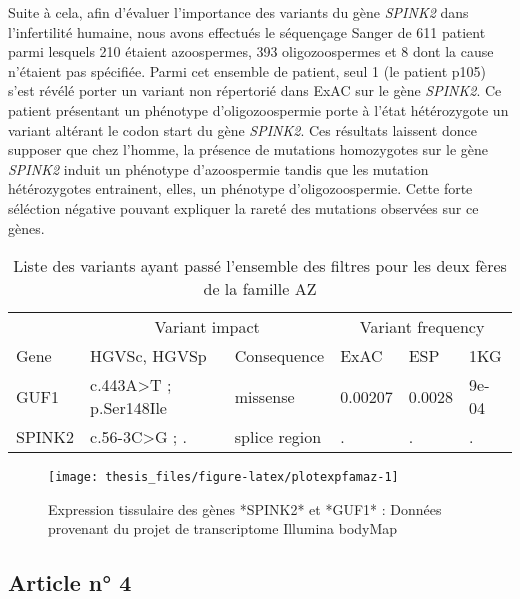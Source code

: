 \documentclass[12pt,twoside]{reedthesis}
\theoremstyle{definition}
\theoremstyle{definition}
\theoremstyle{remark}
\begin{document}
  Suite à cela, afin d'évaluer l'importance des variants du gène
  \emph{SPINK2} dans l'infertilité humaine, nous avons effectués le
  séquençage Sanger de 611 patient parmi lesquels 210 étaient azoospermes,
  393 oligozoospermes et 8 dont la cause n'étaient pas spécifiée. Parmi
  cet ensemble de patient, seul 1 (le patient p105) s'est révélé porter un
  variant non répertorié dans ExAC sur le gène \emph{SPINK2}. Ce patient
  présentant un phénotype d'oligozoospermie porte à l'état hétérozygote un
  variant altérant le codon start du gène \emph{SPINK2}. Ces résultats
  laissent donce supposer que chez l'homme, la présence de mutations
  homozygotes sur le gène \emph{SPINK2} induit un phénotype d'azoospermie
  tandis que les mutation hétérozygotes entrainent, elles, un phénotype
  d'oligozoospermie. Cette forte séléction négative pouvant expliquer la
  rareté des mutations observées sur ce gènes.
  
  \begin{longtable}[t]{llllll}
  \caption{\label{tab:tabrecapaz}Liste des variants ayant passé l'ensemble des filtres pour les deux fères de la famille AZ}\\
  \toprule
  \multicolumn{1}{c}{ } & \multicolumn{2}{c}{Variant impact} & \multicolumn{3}{c}{Variant frequency} \\
  \cmidrule(l{2pt}r{2pt}){2-3} \cmidrule(l{2pt}r{2pt}){4-6}
  Gene & HGVSc, HGVSp & Consequence & ExAC & ESP & 1KG\\
  \midrule
  GUF1 & c.443A>T ; p.Ser148Ile & missense & 0.00207 & 0.0028 & 9e-04\\
  SPINK2 & c.56-3C>G ; . & splice region & . & . & .\\
  \bottomrule
  \end{longtable}
  
  \newpage
  
  \begin{figure}
  
  {\centering \texttt{[image: thesis\_files/figure-latex/plotexpfamaz-1]} 
  
  }
  
  \caption[Expression tissulaire des gènes *SPINK2* et *GUF1*]{Expression tissulaire des gènes *SPINK2* et *GUF1* : Données provenant du projet de transcriptome Illumina bodyMap}\label{fig:plotexpfamaz}
  \end{figure}
  
  \newpage
  
  \subsection{Article n° 4}\label{article-n-4}
  
\end{document}
